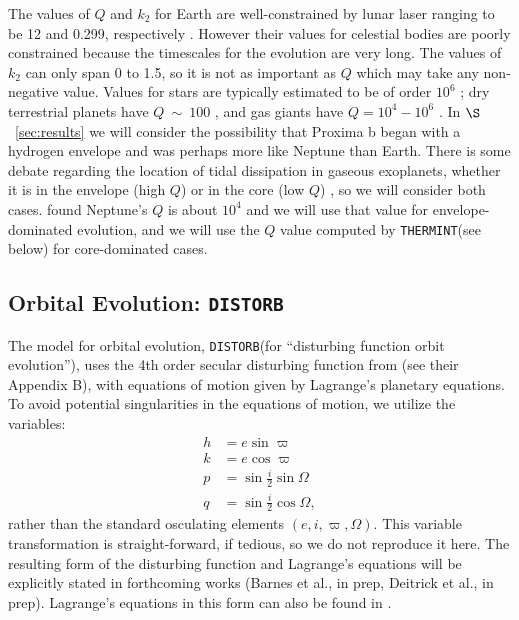 \documentclass[preprint,12pt]{aastex}
\def\eg{{\it e.g.\ }}
\def\distorb{\texttt{\footnotesize{DISTORB}}\xspace}
\def\thermint{\texttt{\footnotesize{THERMINT}}\xspace}
\begin{document}
The values of $Q$ and $k_2$ for Earth are well-constrained by lunar
laser ranging \citep{Dickey94} to be 12 and 0.299, respectively
\citep{Williams78,Yoder95}. However their values for celestial bodies
are poorly constrained because the timescales for the evolution are
very long. The values of $k_2$ can only span 0 to 1.5, so it is not as
important as $Q$ which may take any non-negative value. Values for
stars are typically estimated to be of order $10^6$
\citep[\eg][]{Jackson09}; dry terrestrial planets have $Q~\sim~100$
\citep{Yoder95,Henning09}, and gas giants have $Q=10^4-10^6$
\citep{AksnesFranklin01,Jackson08a}. In $\S$~\ref{sec:results} we
will consider the possibility that Proxima b began with a hydrogen
envelope and was perhaps more like Neptune than Earth. There is some
debate regarding the location of tidal dissipation in gaseous
exoplanets, whether it is in the envelope (high $Q$) or in the core
(low $Q$) \citep[\eg][]{StorchLai14}, so we will consider both
cases. \cite{ZhangHamilton08} found Neptune's $Q$ is about $10^4$ and
we will use that value for envelope-dominated evolution, and we will
use the $Q$ value computed by \thermint (see below) for core-dominated cases.

\subsection{Orbital Evolution: \distorb}
\label{sec:models:distorb}
The model for orbital evolution, \distorb (for ``disturbing function orbit evolution''), 
uses the 4th order secular disturbing function from \cite{MurrayDermott99} 
(see their Appendix B), with equations of motion given by Lagrange's planetary 
equations. To avoid potential singularities in the equations of motion, we utilize 
the variables:
\begin{align}
h & = e \sin{\varpi} \\
k & = e \cos{\varpi} \\
p & = \sin{\frac{i}{2}} \sin{\Omega} \label{eqnp}\\
q & = \sin{\frac{i}{2}} \cos{\Omega} \label{eqnq},
\end{align}
rather than the standard osculating elements $(e,i,\varpi,\Omega)$. This 
variable transformation is straight-forward, if tedious, so we do not 
reproduce it here. The resulting form of the disturbing function and 
Lagrange's equations will be explicitly stated in forthcoming works (Barnes
 et al., in prep, Deitrick et al., in prep). Lagrange's equations in this form 
can also be found in \cite{Berger1991}. 
\end{document}
